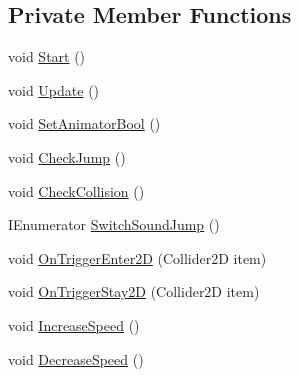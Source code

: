 \subsection*{Private Member Functions}
\begin{DoxyCompactItemize}
\item 
void \mbox{\hyperlink{class_player_controller_ae1117d9c4da3193181cddad2c814e467}{Start}} ()
\item 
void \mbox{\hyperlink{class_player_controller_ae8bc83dffb99867a04be016473ed2c43}{Update}} ()
\item 
void \mbox{\hyperlink{class_player_controller_a13b5778ede2ef8add0e23a3ef3b2e2fc}{Set\+Animator\+Bool}} ()
\item 
void \mbox{\hyperlink{class_player_controller_a154ebcc87f1dd283da03bf6e02a3d1d8}{Check\+Jump}} ()
\item 
void \mbox{\hyperlink{class_player_controller_a65f9b3e3c8ea9f67fa664dff208e5b76}{Check\+Collision}} ()
\item 
I\+Enumerator \mbox{\hyperlink{class_player_controller_a9aea955a866a4a9285cceae7c9dbffdb}{Switch\+Sound\+Jump}} ()
\item 
void \mbox{\hyperlink{class_player_controller_a5089c3b70c67e44c1baa684edf2e49b1}{On\+Trigger\+Enter2D}} (Collider2D item)
\item 
void \mbox{\hyperlink{class_player_controller_a94228bb8a3427c315206d97aa606fe07}{On\+Trigger\+Stay2D}} (Collider2D item)
\item 
void \mbox{\hyperlink{class_player_controller_a64dd699ffa63bad9781acb4a3625d4f5}{Increase\+Speed}} ()
\item 
void \mbox{\hyperlink{class_player_controller_a9739c31a0eb29cf8af79d230df52c92b}{Decrease\+Speed}} ()
\end{DoxyCompactItemize}
